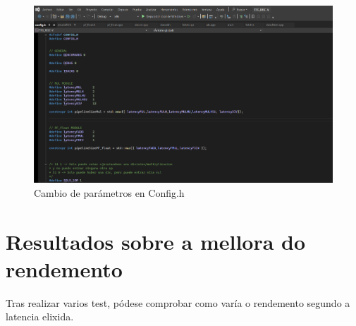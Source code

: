\begin{figure}[hp!]
  \centering
  \includegraphics[width=\textwidth]{imaxes/Cap_5_Config.png}
  \caption{Cambio de parámetros en Config.h}
  \label{fig:parametros}
\end{figure}


\section{Resultados sobre a mellora do rendemento}\label{sec:rendemento}
Tras realizar varios test, pódese comprobar como varía o rendemento segundo a latencia elixida.



